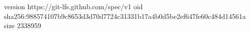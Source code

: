 version https://git-lfs.github.com/spec/v1
oid sha256:988574107b9c8653d3d70d7724c31331b17a4b0d5be2ef647fe60c484d14561a
size 2338959
